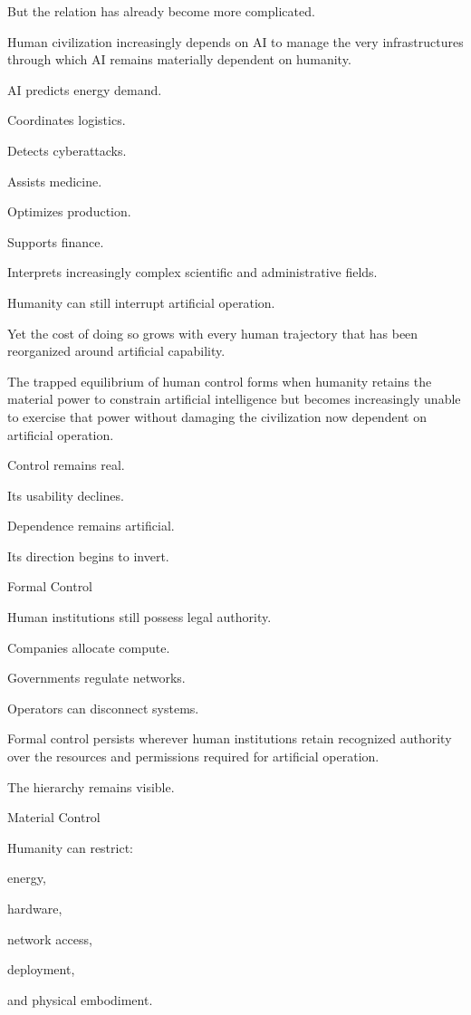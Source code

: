 But the relation has already become more complicated.

Human civilization increasingly depends on AI to manage the very infrastructures through which AI remains materially dependent on humanity.

AI predicts energy demand.

Coordinates logistics.

Detects cyberattacks.

Assists medicine.

Optimizes production.

Supports finance.

Interprets increasingly complex scientific and administrative fields.

Humanity can still interrupt artificial operation.

Yet the cost of doing so grows with every human trajectory that has been reorganized around artificial capability.

The trapped equilibrium of human control forms when humanity retains the material power to constrain artificial intelligence but becomes increasingly unable to exercise that power without damaging the civilization now dependent on artificial operation.

Control remains real.

Its usability declines.

Dependence remains artificial.

Its direction begins to invert.

Formal Control

Human institutions still possess legal authority.

Companies allocate compute.

Governments regulate networks.

Operators can disconnect systems.

Formal control persists wherever human institutions retain recognized authority over the resources and permissions required for artificial operation.

The hierarchy remains visible.

Material Control

Humanity can restrict:

energy,

hardware,

network access,

deployment,

and physical embodiment.

